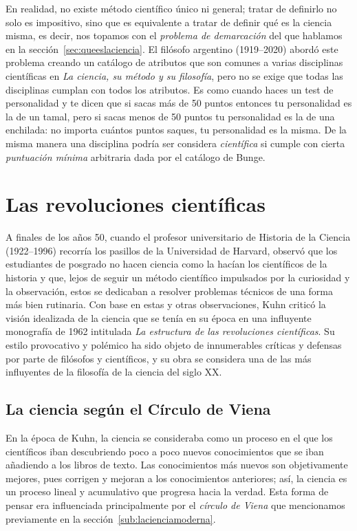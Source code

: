 En realidad, no existe método científico único ni general; tratar de definirlo
no solo es impositivo, sino que es equivalente a tratar de definir qué es la
ciencia misma, es decir, nos topamos con el \emph{problema de demarcación} del
que hablamos en la sección~\ref{sec:queeslaciencia}.
El filósofo argentino  (1919--2020) abordó este
problema creando un catálogo de atributos que son comunes a varias disciplinas
científicas en \emph{La ciencia, su método y su filosofía}\cite{Bunge1996}, pero
no se exige que todas las disciplinas cumplan con todos los atributos.
Es como cuando haces un test de personalidad y te dicen que si sacas más de 50
puntos entonces tu personalidad es la de un tamal, pero si sacas menos de 50
puntos tu personalidad es la de una enchilada: no importa cuántos puntos saques,
tu personalidad es la misma.
De la misma manera una disciplina podría ser considera \emph{científica} si
cumple con cierta \emph{puntuación mínima} arbitraria dada por el catálogo de
Bunge.

\section{Las revoluciones científicas}
\label{sec:lasrevolucionescientificas}
A finales de los años 50, cuando el profesor universitario de Historia de la
Ciencia  (1922--1996) recorría los pasillos de
la Universidad de Harvard, observó que los estudiantes de posgrado no hacen
ciencia como la hacían los científicos de la historia y que, lejos de seguir un
método científico impulsados por la curiosidad y la observación, estos se
dedicaban a resolver problemas técnicos de una forma más bien rutinaria.
Con base en estas y otras observaciones, Kuhn criticó la visión idealizada de la
ciencia que se tenía en su época en una influyente monografía de 1962
intitulada \emph{La estructura de las revoluciones científicas}\cite{Kuhn2005}.
Su estilo provocativo y polémico ha sido objeto de innumerables críticas y
defensas por parte de filósofos y científicos, y su obra se considera una de
las más influyentes de la filosofía de la ciencia del siglo XX.

\subsection*{La ciencia según el Círculo de Viena}
\label{sub:circulodeviena}
En la época de Kuhn, la ciencia se consideraba como un proceso en el que los
científicos iban descubriendo poco a poco nuevos conocimientos que se iban
añadiendo a los libros de texto.
Las conocimientos más nuevos son objetivamente mejores, pues corrigen y mejoran
a los conocimientos anteriores; así, la ciencia es un proceso lineal y
acumulativo que progresa hacia la verdad.
Esta forma de pensar era influenciada principalmente por el \emph{círculo de
    Viena} que mencionamos previamente en la sección~\ref{sub:lacienciamoderna}.

